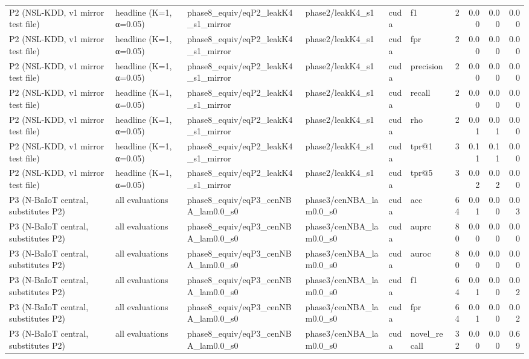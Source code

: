 \begin{tabular}{llllllrrrr}
P2 (NSL-KDD, v1 mirror test file) & headline (K=1, α=0.05) & phase8\_equiv/eqP2\_leakK4\_s1\_mirror & phase2/leakK4\_s1 & cuda & f1 & 2 & 0.00 & 0.00 & 0.00 \\
P2 (NSL-KDD, v1 mirror test file) & headline (K=1, α=0.05) & phase8\_equiv/eqP2\_leakK4\_s1\_mirror & phase2/leakK4\_s1 & cuda & fpr & 2 & 0.00 & 0.00 & 0.00 \\
P2 (NSL-KDD, v1 mirror test file) & headline (K=1, α=0.05) & phase8\_equiv/eqP2\_leakK4\_s1\_mirror & phase2/leakK4\_s1 & cuda & precision & 2 & 0.00 & 0.00 & 0.00 \\
P2 (NSL-KDD, v1 mirror test file) & headline (K=1, α=0.05) & phase8\_equiv/eqP2\_leakK4\_s1\_mirror & phase2/leakK4\_s1 & cuda & recall & 2 & 0.00 & 0.00 & 0.00 \\
P2 (NSL-KDD, v1 mirror test file) & headline (K=1, α=0.05) & phase8\_equiv/eqP2\_leakK4\_s1\_mirror & phase2/leakK4\_s1 & cuda & rho & 2 & 0.01 & 0.01 & 0.00 \\
P2 (NSL-KDD, v1 mirror test file) & headline (K=1, α=0.05) & phase8\_equiv/eqP2\_leakK4\_s1\_mirror & phase2/leakK4\_s1 & cuda & tpr@1 & 3 & 0.11 & 0.11 & 0.00 \\
P2 (NSL-KDD, v1 mirror test file) & headline (K=1, α=0.05) & phase8\_equiv/eqP2\_leakK4\_s1\_mirror & phase2/leakK4\_s1 & cuda & tpr@5 & 3 & 0.02 & 0.02 & 0.00 \\
P3 (N-BaIoT central, substitutes P2) & all evaluations & phase8\_equiv/eqP3\_cenNBA\_lam0.0\_s0 & phase3/cenNBA\_lam0.0\_s0 & cuda & acc & 64 & 0.01 & 0.00 & 0.03 \\
P3 (N-BaIoT central, substitutes P2) & all evaluations & phase8\_equiv/eqP3\_cenNBA\_lam0.0\_s0 & phase3/cenNBA\_lam0.0\_s0 & cuda & auprc & 80 & 0.00 & 0.00 & 0.00 \\
P3 (N-BaIoT central, substitutes P2) & all evaluations & phase8\_equiv/eqP3\_cenNBA\_lam0.0\_s0 & phase3/cenNBA\_lam0.0\_s0 & cuda & auroc & 80 & 0.00 & 0.00 & 0.00 \\
P3 (N-BaIoT central, substitutes P2) & all evaluations & phase8\_equiv/eqP3\_cenNBA\_lam0.0\_s0 & phase3/cenNBA\_lam0.0\_s0 & cuda & f1 & 64 & 0.01 & 0.00 & 0.02 \\
P3 (N-BaIoT central, substitutes P2) & all evaluations & phase8\_equiv/eqP3\_cenNBA\_lam0.0\_s0 & phase3/cenNBA\_lam0.0\_s0 & cuda & fpr & 64 & 0.01 & 0.00 & 0.02 \\
P3 (N-BaIoT central, substitutes P2) & all evaluations & phase8\_equiv/eqP3\_cenNBA\_lam0.0\_s0 & phase3/cenNBA\_lam0.0\_s0 & cuda & novel\_recall & 32 & 0.00 & 0.00 & 0.69 \\

\end{tabular}
